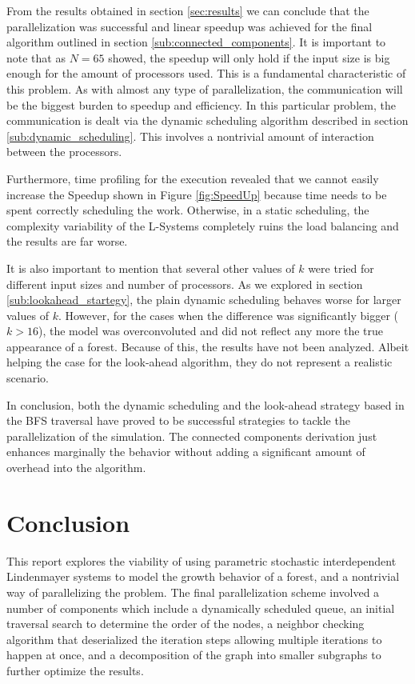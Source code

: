 \documentclass[letterpaper,twoside,11pt]{article}
\begin{document}
\begin{multicols}{2}
From the results obtained in section \ref{sec:results} we can conclude that the parallelization was successful and linear speedup was achieved for the final algorithm outlined in section \ref{sub:connected_components}. It is important to note that as $N = 65$ showed, the speedup will only hold if the input size is big enough for the amount of processors used. This is a fundamental characteristic of this problem. As with almost any type of parallelization, the communication will be the biggest burden to speedup and efficiency. In this particular problem, the communication is dealt via the dynamic scheduling algorithm described in section \ref{sub:dynamic_scheduling}. This involves a nontrivial amount of interaction between the processors.

\vfill
\columnbreak
Furthermore, time profiling for the execution revealed that we cannot easily increase the Speedup shown in Figure \ref{fig:SpeedUp} because time needs to be spent correctly scheduling the work. Otherwise, in a static scheduling, the complexity variability of the L-Systems completely ruins the load balancing and the results are far worse.

It is also important to mention that several other values of $k$ were tried for different input sizes and number of processors. As we explored in section \ref{sub:lookahead_startegy}, the plain dynamic scheduling behaves worse for larger values of $k$. However, for the cases when the difference was significantly bigger ($k > 16$), the model was overconvoluted and did not reflect any more the true appearance of a forest. Because of this, the results have not been analyzed. Albeit helping the case for the look-ahead algorithm, they do not represent a realistic scenario.

In conclusion, both the dynamic scheduling and the look-ahead strategy based in the BFS traversal have proved to be successful strategies to tackle the parallelization of the simulation. The connected components derivation just enhances marginally the behavior without adding a significant amount of overhead into the algorithm.



\section{Conclusion} %
\label{sec:conclusion}

This report explores the viability of using parametric stochastic interdependent Lindenmayer systems to model the growth behavior of a forest, and a nontrivial way of parallelizing the problem. The final parallelization scheme involved a number of components which include a dynamically scheduled queue, an initial traversal search to determine the order of the nodes, a neighbor checking algorithm that deserialized the iteration steps allowing multiple iterations to happen at once, and a decomposition of the graph into smaller subgraphs to further optimize the results.


\end{multicols}
\end{document}
